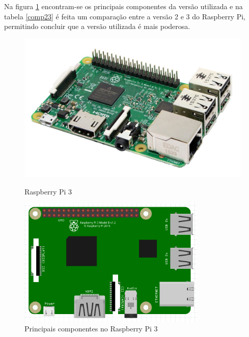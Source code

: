  Na figura \ref{comprasp1} encontram-se os principais componentes da versão utilizada e na tabela \ref{comp23} é feita um comparação entre a versão 2 e 3 do Raspberry Pi, permitindo concluir que a versão utilizada é mais poderosa. 



\begin{figure}[h]
	\centering
	\begin{minipage}[b]{0.49\textwidth}
		\centering
		\includegraphics[width=\textwidth]{img/hardware/rasp3-img.jpg}
		\caption{Raspberry Pi 3}
		\label{rasp1}
	\end{minipage}
	\hfill
	\begin{minipage}[b]{0.49\textwidth}
		\centering
		\includegraphics[width=0.8\textwidth]{img/hardware/rasp-esquema.PNG}
		\caption{Principais componentes no Raspberry Pi 3 }
		\label{comprasp1}
		
	\end{minipage}
\end{figure}




